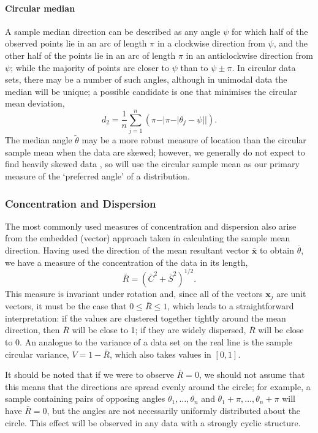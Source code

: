 \documentclass[../../ArchStats.tex]{subfiles}
\begin{document}
\paragraph{Circular median \\} 

A sample median direction can be described as any angle $\psi$ for which half of the observed points lie in an arc of length $\pi$ in a clockwise direction from $\psi$, and the other half of the points lie in an arc of length $\pi$ in an anticlockwise direction from $\psi$; while the majority of points are closer to $\psi$ than to $\psi \pm \pi$.  In circular data sets, there may be a number of such angles, although in unimodal data the median will be unique; a possible candidate is one that minimises the circular mean deviation,
\[d_2 = \frac{1}{n} \sum_{j=1}^n \left( \pi - \vert \pi - \vert \theta_j - \psi \vert \vert \right).\]
The median angle $\tilde{\theta}$ may be a more robust measure of location than the circular sample mean when the data are skewed; however, we generally do not expect to find heavily skewed data , so will use the circular sample mean as our primary measure of the `preferred angle' of a distribution.


\subsubsection{Concentration and Dispersion}

The most commonly used measures of concentration and dispersion also arise from the embedded (vector) approach taken in calculating the sample mean direction. Having used the direction of the mean resultant vector $\boldsymbol{\bar{x}}$ to obtain $\bar{\theta}$, we have a measure of the concentration of the data in its length, 
	\begin{equation}
	\label{eqn:R-bar}
	\bar{R} = (\bar{C}^2 + \bar{S}^2)^{1/2}.
	\end{equation}
This measure is invariant under rotation and, since all of the vectors $\boldsymbol{x}_j$ are unit vectors, it must be the case that $0 \leq \bar{R} \leq 1$, which leads to a straightforward interpretation: if the values are clustered together tightly around the mean direction, then $\bar{R}$ will be close to 1; if they are widely dispersed, $\bar{R}$ will be close to 0. An analogue to the variance of a data set on the real line is the sample circular variance, $V = 1- \bar{R}$, which also takes values in $[0,1]$. 

It should be noted that if we were to observe $\bar{R} = 0$, we should not assume that this means that the directions are spread evenly around the circle; for example, a sample containing pairs of opposing angles $\theta_1, \dots, \theta_n$ and $\theta_1+\pi, \dots, \theta_n+\pi$ will have $\bar{R} = 0$, but the angles are not necessarily uniformly distributed about the circle. This effect will be observed in any data with a strongly cyclic structure.
\end{document}
